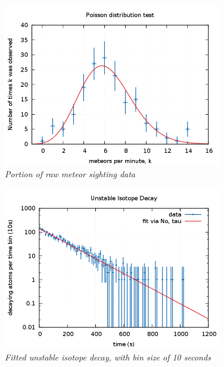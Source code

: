 \documentclass[11pt]{article}
\begin{document}
\begin{figure}[H]
  \begin{center}
\centerline{\includegraphics[width=3.75in]{histwitherr.png}}
\caption{\it \small{Portion of raw meteor sighting data \label{fig3}}}
  \end{center}
\end{figure}


\begin{figure}[H]
  \begin{center}
\centerline{\includegraphics[width=3.75in]{decayfit.png}}
\caption{\it \small{Fitted unstable isotope decay, with bin size of 10 seconds \label{fig4}}}
  \end{center}
\end{figure}
\end{document}

